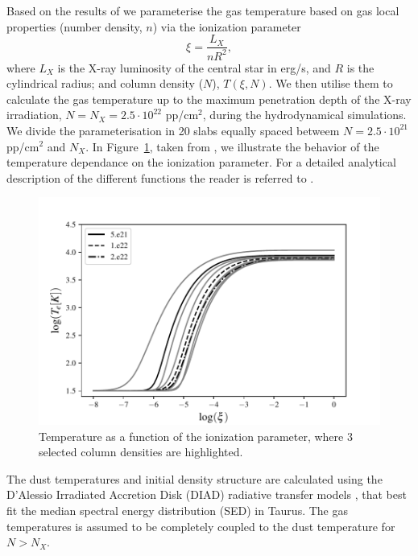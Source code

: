 \documentclass{aa}
\begin{document}
Based on the results of  we parameterise the gas temperature based on gas local properties (number density, $n$) via the ionization parameter
\begin{equation}
    \xi = \frac{L_X}{n R^2},
\end{equation}
where $L_X$ is the X-ray luminosity of the central star in erg/s, and $R$ is the cylindrical radius; and column density ($N$), $T(\xi,N)$.
We then utilise them to calculate the gas temperature up to the maximum penetration depth of the X-ray irradiation, $N = N_X = 2.5\cdot 10^{22}$ pp/cm$^2$, during the hydrodynamical simulations.
We divide the parameterisation in 20 slabs equally spaced betweem $N=2.5\cdot 10^{21}$ pp/cm$^2$ and $N_X$. In Figure~\ref{fig:tempxi}, taken from , we illustrate the behavior of the temperature dependance on the ionization parameter. For a detailed analytical description of the different functions the reader is referred to .

\begin{figure}
    \centering
    \includegraphics[width=.45\textwidth]{Fig1}
    \caption{Temperature as a function of the ionization parameter, where $3$ selected column densities are highlighted. \label{fig:tempxi}}
\end{figure}

The dust temperatures and initial density structure are calculated using the D’Alessio
Irradiated Accretion Disk (\textsc{DIAD}) radiative transfer models , that best fit the median spectral energy distribution (SED) in Taurus.
The gas temperatures is assumed to be completely coupled to the dust temperature for $N>N_X$.
\end{document}
